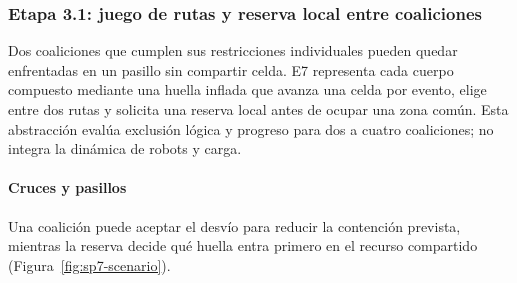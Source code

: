 \subsubsection{Etapa 3.1: juego de rutas y reserva local entre coaliciones}
\label{subsubsec:sp3-traffic}

Dos coaliciones que cumplen sus restricciones individuales pueden quedar enfrentadas en un pasillo sin compartir celda. E7 representa cada cuerpo compuesto mediante una huella inflada que avanza una celda por evento, elige entre dos rutas y solicita una reserva local antes de ocupar una zona común. Esta abstracción evalúa exclusión lógica y progreso para dos a cuatro coaliciones; no integra la dinámica de robots y carga.

\paragraph{Cruces y pasillos}

Una coalición puede aceptar el desvío para reducir la contención prevista, mientras la reserva decide qué huella entra primero en el recurso compartido (Figura~\ref{fig:sp7-scenario}).

